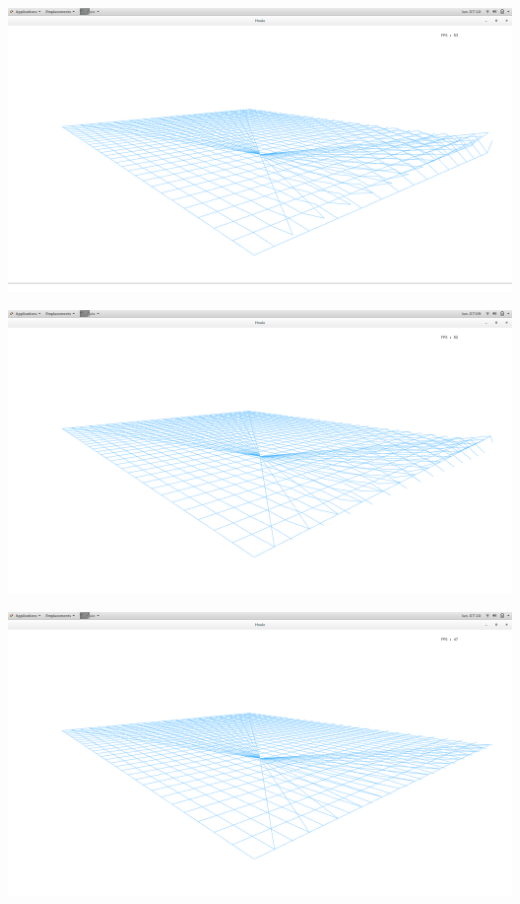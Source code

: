 \documentclass{article}
\begin{document}
\vspace{0.5cm}

\includegraphics[scale=0.2]{./res/7.png}

\vspace{0.5cm}

\includegraphics[scale=0.2]{./res/8.png}

\vspace{0.5cm}

\includegraphics[scale=0.2]{./res/plat.png}
\end{document}
